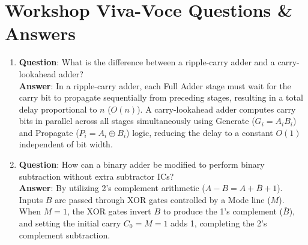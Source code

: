 \section{Workshop Viva-Voce Questions \& Answers}
\begin{enumerate}[leftmargin=1.5em]
    \item \textbf{Question}: What is the difference between a ripple-carry adder and a carry-lookahead adder?\\
    \textbf{Answer}: In a ripple-carry adder, each Full Adder stage must wait for the carry bit to propagate sequentially from preceding stages, resulting in a total delay proportional to $n$ ($O(n)$). A carry-lookahead adder computes carry bits in parallel across all stages simultaneously using Generate ($G_i = A_i B_i$) and Propagate ($P_i = A_i \oplus B_i$) logic, reducing the delay to a constant $O(1)$ independent of bit width.
    \item \textbf{Question}: How can a binary adder be modified to perform binary subtraction without extra subtractor ICs?\\
    \textbf{Answer}: By utilizing 2's complement arithmetic ($A - B = A + \overline{B} + 1$). Inputs $B$ are passed through XOR gates controlled by a Mode line ($M$). When $M=1$, the XOR gates invert $B$ to produce the 1's complement ($\overline{B}$), and setting the initial carry $C_0 = M = 1$ adds 1, completing the 2's complement subtraction.
\end{enumerate}
